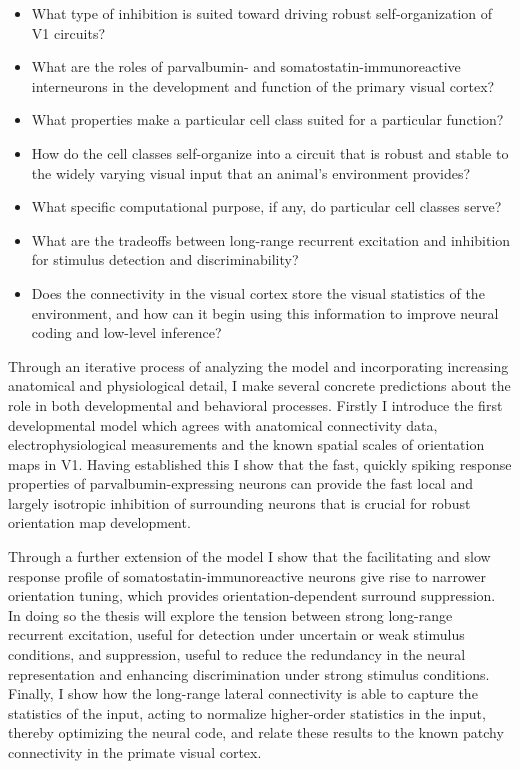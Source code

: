 \begin{itemize}
\item What type of inhibition is suited toward driving robust
  self-organization of V1 circuits?
\item What are the roles of parvalbumin- and somatostatin-immunoreactive
  interneurons in the development and function of the primary visual
  cortex?
\item What properties make a particular cell class suited for a
  particular function?
\item How do the cell classes self-organize into a circuit that is
  robust and stable to the widely varying visual input that an
  animal's environment provides?
\item What specific computational purpose, if any, do particular cell
  classes serve?
\item What are the tradeoffs between long-range recurrent excitation
  and inhibition for stimulus detection and discriminability?
\item Does the connectivity in the visual cortex store the visual
  statistics of the environment, and how can it begin using this
  information to improve neural coding and low-level inference?
\end{itemize}

Through an iterative process of analyzing the model and incorporating
increasing anatomical and physiological detail, I make several
concrete predictions about the role in both developmental and
behavioral processes. Firstly I introduce the first developmental
model which agrees with anatomical connectivity data,
electrophysiological measurements and the known spatial scales of
orientation maps in V1.  Having established this I show that the fast,
quickly spiking response properties of parvalbumin-expressing neurons
can provide the fast local and largely isotropic inhibition of
surrounding neurons that is crucial for robust orientation map
development.

Through a further extension of the model I show that the facilitating
and slow response profile of somatostatin-immunoreactive neurons give
rise to narrower orientation tuning, which provides
orientation-dependent surround suppression. In doing so the thesis
will explore the tension between strong long-range recurrent
excitation, useful for detection under uncertain or weak stimulus
conditions, and suppression, useful to reduce the redundancy in the
neural representation and enhancing discrimination under strong
stimulus conditions. Finally, I show how the long-range lateral
connectivity is able to capture the statistics of the input, acting to
normalize higher-order statistics in the input, thereby optimizing the
neural code, and relate these results to the known patchy connectivity
in the primate visual cortex.

